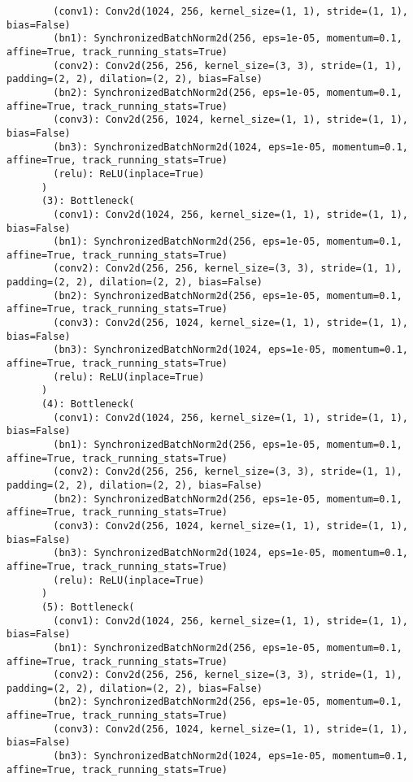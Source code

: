 \begin{verbatim}
        (conv1): Conv2d(1024, 256, kernel_size=(1, 1), stride=(1, 1), bias=False)
        (bn1): SynchronizedBatchNorm2d(256, eps=1e-05, momentum=0.1, affine=True, track_running_stats=True)
        (conv2): Conv2d(256, 256, kernel_size=(3, 3), stride=(1, 1), padding=(2, 2), dilation=(2, 2), bias=False)
        (bn2): SynchronizedBatchNorm2d(256, eps=1e-05, momentum=0.1, affine=True, track_running_stats=True)
        (conv3): Conv2d(256, 1024, kernel_size=(1, 1), stride=(1, 1), bias=False)
        (bn3): SynchronizedBatchNorm2d(1024, eps=1e-05, momentum=0.1, affine=True, track_running_stats=True)
        (relu): ReLU(inplace=True)
      )
      (3): Bottleneck(
        (conv1): Conv2d(1024, 256, kernel_size=(1, 1), stride=(1, 1), bias=False)
        (bn1): SynchronizedBatchNorm2d(256, eps=1e-05, momentum=0.1, affine=True, track_running_stats=True)
        (conv2): Conv2d(256, 256, kernel_size=(3, 3), stride=(1, 1), padding=(2, 2), dilation=(2, 2), bias=False)
        (bn2): SynchronizedBatchNorm2d(256, eps=1e-05, momentum=0.1, affine=True, track_running_stats=True)
        (conv3): Conv2d(256, 1024, kernel_size=(1, 1), stride=(1, 1), bias=False)
        (bn3): SynchronizedBatchNorm2d(1024, eps=1e-05, momentum=0.1, affine=True, track_running_stats=True)
        (relu): ReLU(inplace=True)
      )
      (4): Bottleneck(
        (conv1): Conv2d(1024, 256, kernel_size=(1, 1), stride=(1, 1), bias=False)
        (bn1): SynchronizedBatchNorm2d(256, eps=1e-05, momentum=0.1, affine=True, track_running_stats=True)
        (conv2): Conv2d(256, 256, kernel_size=(3, 3), stride=(1, 1), padding=(2, 2), dilation=(2, 2), bias=False)
        (bn2): SynchronizedBatchNorm2d(256, eps=1e-05, momentum=0.1, affine=True, track_running_stats=True)
        (conv3): Conv2d(256, 1024, kernel_size=(1, 1), stride=(1, 1), bias=False)
        (bn3): SynchronizedBatchNorm2d(1024, eps=1e-05, momentum=0.1, affine=True, track_running_stats=True)
        (relu): ReLU(inplace=True)
      )
      (5): Bottleneck(
        (conv1): Conv2d(1024, 256, kernel_size=(1, 1), stride=(1, 1), bias=False)
        (bn1): SynchronizedBatchNorm2d(256, eps=1e-05, momentum=0.1, affine=True, track_running_stats=True)
        (conv2): Conv2d(256, 256, kernel_size=(3, 3), stride=(1, 1), padding=(2, 2), dilation=(2, 2), bias=False)
        (bn2): SynchronizedBatchNorm2d(256, eps=1e-05, momentum=0.1, affine=True, track_running_stats=True)
        (conv3): Conv2d(256, 1024, kernel_size=(1, 1), stride=(1, 1), bias=False)
        (bn3): SynchronizedBatchNorm2d(1024, eps=1e-05, momentum=0.1, affine=True, track_running_stats=True)

\end{verbatim}
